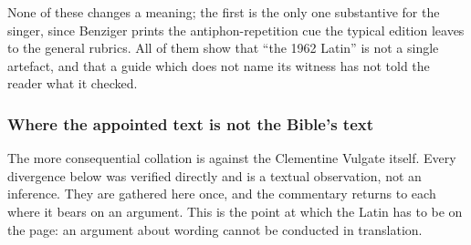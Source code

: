 None of these changes a meaning; the first is the only one substantive for the
singer, since Benziger prints the antiphon-repetition cue the typical edition
leaves to the general rubrics. All of them show that ``the 1962 Latin'' is not
a single artefact, and that a guide which does not name its witness has not
told the reader what it checked.

\subsubsection*{Where the appointed text is not the Bible's text}

The more consequential collation is against the Clementine Vulgate itself.
Every divergence below was verified directly and is a textual observation, not
an inference. They are gathered here once, and the commentary returns to each
where it bears on an argument. This is the point at which the Latin has to be
on the page: an argument about wording cannot be conducted in translation.

